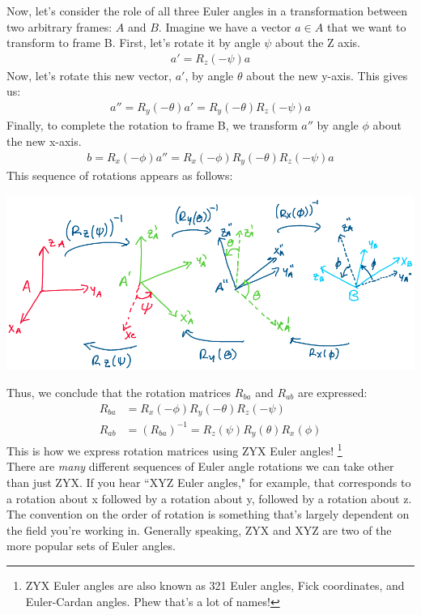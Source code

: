 \documentclass[oneside]{book}
\begin{document}
Now, let's consider the role of all three Euler angles in a transformation between two arbitrary frames: $A$ and $B$. Imagine we have a vector $a \in A$ that we want to transform to frame B. First, let's rotate it by angle $\psi$ about the Z axis.
\begin{align}
    a' = R_z(-\psi)a
\end{align}
Now, let's rotate this new vector, $a'$, by angle $\theta$ about the new y-axis. This gives us:
\begin{align}
    a'' = R_y(-\theta)a' = R_y(-\theta)R_z(-\psi)a
\end{align}
Finally, to complete the rotation to frame B, we transform $a''$ by angle $\phi$ about the new x-axis.
\begin{align}
    b = R_x(-\phi)a'' = R_x(-\phi)R_y(-\theta)R_z(-\psi)a
\end{align}
This sequence of rotations appears as follows:
\begin{center}
    \includegraphics[scale=0.3]{images/full_euler.png}
\end{center}
Thus, we conclude that the rotation matrices $R_{ba}$ and $R_{ab}$ are expressed:
\begin{align}
    R_{ba} &=  R_x(-\phi)R_y(-\theta)R_z(-\psi)\\
    R_{ab} &= (R_{ba})^{-1} = R_z(\psi)R_y(\theta)R_x(\phi)
\end{align}
This is how we express rotation matrices using ZYX Euler angles! \footnote{ZYX Euler angles are also known as 321 Euler angles, Fick coordinates, and Euler-Cardan angles. Phew that's a lot of names!}\\
There are \textit{many} different sequences of Euler angle rotations we can take other than just ZYX. If you hear ``XYZ Euler angles," for example, that corresponds to a rotation about x followed by a rotation about y, followed by a rotation about z.\\
The convention on the order of rotation is something that's largely dependent on the field you're working in. Generally speaking, ZYX and XYZ are two of the more popular sets of Euler angles.\\
\end{document}
